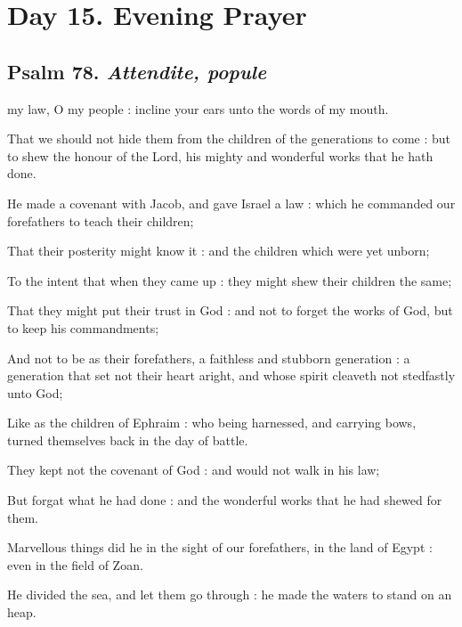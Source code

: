 \section*{Day 15. Evening Prayer}

\subsection{Psalm 78. \textit{Attendite, popule}}

 my law, O my people : incline your ears unto the words of my mouth.\par
{}
That we should not hide them from the children of the generations to come : but to shew the honour of the Lord, his mighty and wonderful works that he hath done.\par
{}He made a covenant with Jacob, and gave Israel a law : which he commanded our forefathers to teach their children;\par
{}That their posterity might know it : and the children which were yet unborn;\par
{}To the intent that when they came up : they might shew their children the same;\par
{}That they might put their trust in God : and not to forget the works of God, but to keep his commandments;\par
{}And not to be as their forefathers, a faithless and stubborn generation : a generation that set not their heart aright, and whose spirit cleaveth not stedfastly unto God;\par
{}Like as the children of Ephraim : who being harnessed, and carrying bows, turned themselves back in the day of battle.\par
{}They kept not the covenant of God : and would not walk in his law;\par
{}But forgat what he had done : and the wonderful works that he had shewed for them.\par
{}Marvellous things did he in the sight of our forefathers, in the land of Egypt : even in the field of Zoan.\par
{}He divided the sea, and let them go through : he made the waters to stand on an heap.\par
